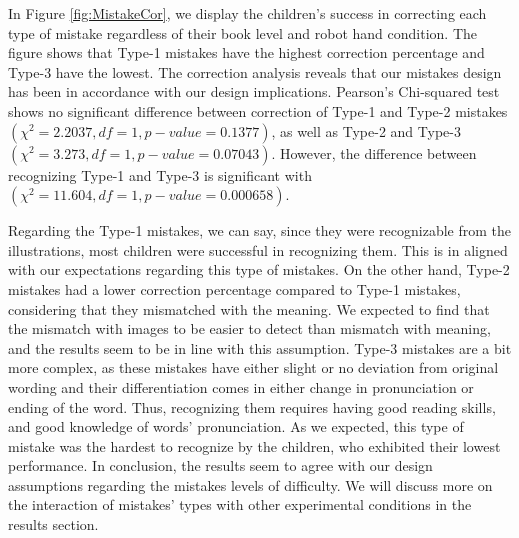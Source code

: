 \documentclass{sigchi}
\begin{document}
In Figure \ref{fig:MistakeCor}, we display the children's success in correcting each type of mistake regardless of their book level and robot hand condition. 
The figure shows that Type-1 mistakes have the highest correction percentage and Type-3 have the lowest.  
The correction analysis reveals that our mistakes design has been in accordance with our design implications.
Pearson's Chi-squared test shows no significant difference between correction of Type-1 and Type-2 mistakes $(\chi^2 = 2.2037, df = 1, p-value = 0.1377)$, as well as Type-2 and Type-3 $(\chi^2 = 3.273, df = 1, p-value = 0.07043)$.
However, the difference between recognizing Type-1 and Type-3 is significant with $(\chi^2 = 11.604, df = 1, p-value = 0.000658)$.



Regarding the Type-1 mistakes, we can say, since they were recognizable from the illustrations, most children were successful in recognizing them.
This is in aligned with our expectations regarding this type of mistakes.
On the other hand, Type-2 mistakes had a lower correction percentage compared to Type-1 mistakes, 
considering that they mismatched with the meaning.
We expected to find that the mismatch with images to be easier to detect than mismatch with meaning, and the results seem to be in line with this assumption. 
Type-3 mistakes are a bit more complex, as these mistakes have either slight or no deviation from original wording and their differentiation comes in either change in pronunciation or ending of the word.
Thus, recognizing them requires having good reading skills, and good knowledge of words' pronunciation.
As we expected, this type of mistake was the hardest to recognize by the children, who exhibited their lowest performance.
In conclusion, the results seem to agree with our design assumptions regarding the mistakes levels of difficulty. 
We will discuss more on the interaction of mistakes' types  with other experimental conditions in the results section.
\end{document}
